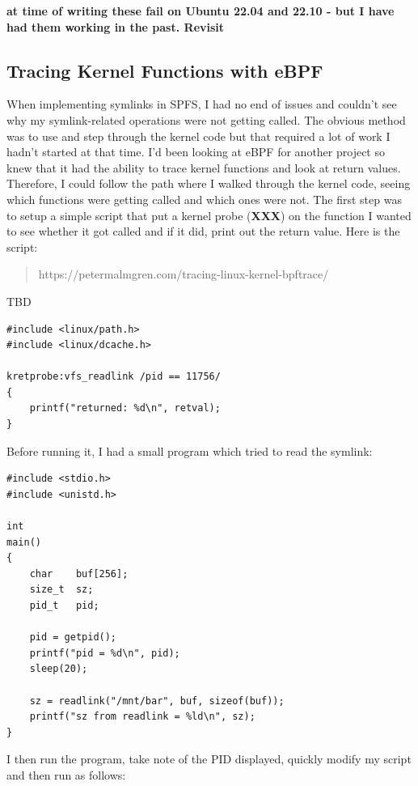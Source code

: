 \noindent
\textbf{at time of writing these fail on Ubuntu 22.04 and 22.10 - but I have had them working in the past. Revisit}

\subsection{Tracing Kernel Functions with eBPF}\label{debug-ebpf}

When implementing symlinks in SPFS, I had no end of issues and couldn't see why my symlink-related operations were not getting called. The obvious method was to use  and step through the kernel code but that required a lot of work I hadn't started at that time. I'd been looking at eBPF for another project so knew that it had the ability to trace kernel functions and look at return values. Therefore, I could follow the path where I walked through the kernel code, seeing which functions were getting called and which ones were not. The first step was to setup a simple script that put a kernel probe ({\bf XXX}) on the function I wanted to see whether it got called and if it did, print out the return value. Here is the script:

\begin{quote}
https://petermalmgren.com/tracing-linux-kernel-bpftrace/
\end{quote}

TBD

\begin{lstlisting}
#include <linux/path.h>
#include <linux/dcache.h>

kretprobe:vfs_readlink /pid == 11756/
{
    printf("returned: %d\n", retval);
}
\end{lstlisting}

\noindent
Before running it, I had a small program which tried to read the symlink:

\begin{lstlisting}
#include <stdio.h>
#include <unistd.h>

int
main()
{
    char    buf[256];
    size_t  sz;
    pid_t   pid;

    pid = getpid();
    printf("pid = %d\n", pid);
    sleep(20);

    sz = readlink("/mnt/bar", buf, sizeof(buf));
    printf("sz from readlink = %ld\n", sz);
}
\end{lstlisting}

\noindent
I then run the program, take note of the PID displayed, quickly modify my script and then run as follows:

